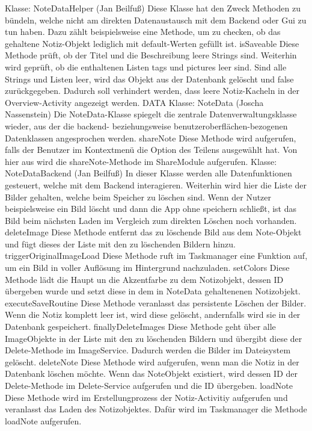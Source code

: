 Klasse: NoteDataHelper (Jan Beilfuß)
Diese Klasse hat den Zweck Methoden zu bündeln, welche nicht am direkten Datenaustausch mit dem Backend oder Gui zu tun haben. Dazu zählt beispielsweise eine Methode, um zu checken, ob das gehaltene Notiz-Objekt lediglich mit default-Werten gefüllt ist.
isSaveable
 Diese Methode prüft, ob der Titel und die Beschreibung leere Strings sind. Weiterhin wird geprüft, ob die enthaltenen Listen tags und pictures leer sind. Sind alle Strings und Listen leer, wird das Objekt aus der Datenbank gelöscht und false zurückgegeben. Dadurch soll verhindert werden, dass leere Notiz-Kacheln in der Overview-Activity angezeigt werden.
DATA
Klasse: NoteData (Joscha Nassenstein)
Die NoteData-Klasse spiegelt die zentrale Datenverwaltungsklasse wieder, aus der die backend- beziehungsweise benutzeroberflächen-bezogenen Datenklassen angesprochen werden.
shareNote
Diese Methode wird aufgerufen, falls der Benutzer im Kontextmenü die Option des Teilens ausgewählt hat. Von hier aus wird die shareNote-Methode im ShareModule aufgerufen.
Klasse: NoteDataBackend (Jan Beilfuß)
In dieser Klasse werden alle Datenfunktionen gesteuert, welche mit dem Backend interagieren. Weiterhin wird hier die Liste der Bilder gehalten, welche beim Speicher zu löschen sind. Wenn der Nutzer beispielsweise ein Bild löscht und dann die App ohne speichern schließt, ist das Bild beim nächsten Laden im Vergleich zum direkten Löschen noch vorhanden.
deleteImage
Diese Methode entfernt das zu löschende Bild aus dem Note-Objekt und fügt dieses der Liste mit den zu löschenden Bildern hinzu.
triggerOriginalImageLoad
Diese Methode ruft im Taskmanager eine Funktion auf, um ein Bild in voller Auflösung im Hintergrund nachzuladen.
setColors
Diese Methode lädt die Haupt un die Akzentfarbe zu dem Notizobjekt, dessen ID übergeben wurde und setzt diese in dem in NoteData gehaltenenen Notizobjekt.
executeSaveRoutine
Diese Methode veranlasst das persistente Löschen der Bilder. Wenn die Notiz komplett leer ist, wird diese gelöscht, andernfalls wird sie in der Datenbank gespeichert. 
finallyDeleteImages
Diese Methode geht über alle ImageObjekte in der Liste mit den zu löschenden Bildern und übergibt diese der Delete-Methode im ImageService. Dadurch werden die Bilder im Dateisystem gelöscht.
deleteNote 
Diese Methode wird aufgerufen, wenn man die Notiz in der Datenbank löschen möchte. Wenn das NoteObjekt existiert, wird dessen ID der Delete-Methode im Delete-Service aufgerufen und die ID übergeben.
loadNote
Diese Methode wird im Erstellungprozess der Notiz-Activitiy aufgerufen und veranlasst das Laden des Notizobjektes. Dafür wird im Taskmanager die Methode loadNote aufgerufen.
